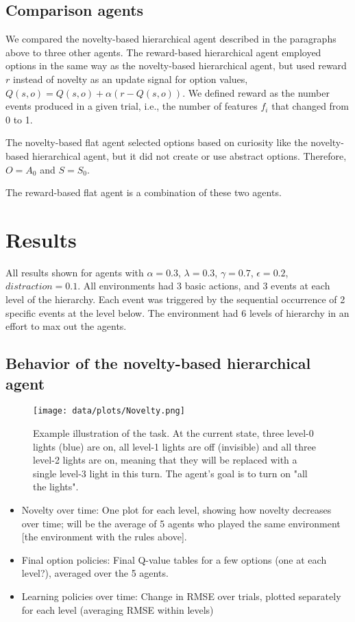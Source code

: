 \documentclass{article}
\begin{document}
\subsection{Comparison agents}

We compared the novelty-based hierarchical agent described in the paragraphs above to three other agents. The reward-based hierarchical agent employed options in the same way as the novelty-based hierarchical agent, but used reward $r$ instead of novelty as an update signal for option values, $Q(s, o) = Q(s, o) + \alpha (r - Q(s, o))$. We defined reward as the number events produced in a given trial, i.e., the number of features $f_i$ that changed from 0 to 1. 

The novelty-based flat agent selected options based on curiosity like the novelty-based hierarchical agent, but it did not create or use abstract options. Therefore, $O = A_0$ and $S = S_0$. 

The reward-based flat agent is a combination of these two agents.

\section{Results}

All results shown for agents with $\alpha = 0.3$, $\lambda = 0.3$, $\gamma = 0.7$, $\epsilon = 0.2$, $distraction = 0.1$. All environments had 3 basic actions, and 3 events at each level of the hierarchy. Each event was triggered by the sequential occurrence of 2 specific events at the level below. The environment had 6 levels of hierarchy in an effort to max out the agents. 

\subsection{Behavior of the novelty-based hierarchical agent}

\begin{figure}[h]
	\centering
	\texttt{[image: data/plots/Novelty.png]}
	\caption{Example illustration of the task. At the current state, three level-0 lights (blue) are on, all level-1 lights are off (invisible) and all three level-2 lights are on, meaning that they will be replaced with a single level-3 light in this turn. The agent's goal is to turn on "all the lights".}
	\label{TaskFigure}
\end{figure}

\begin{itemize}
	\item Novelty over time: One plot for each level, showing how novelty decreases over time; will be the average of 5 agents who played the same environment [the environment with the rules above].
	\item Final option policies: Final Q-value tables for a few options (one at each level?), averaged over the 5 agents.
	\item Learning policies over time: Change in RMSE over trials, plotted separately for each level (averaging RMSE within levels)
\end{itemize}
\end{document}

